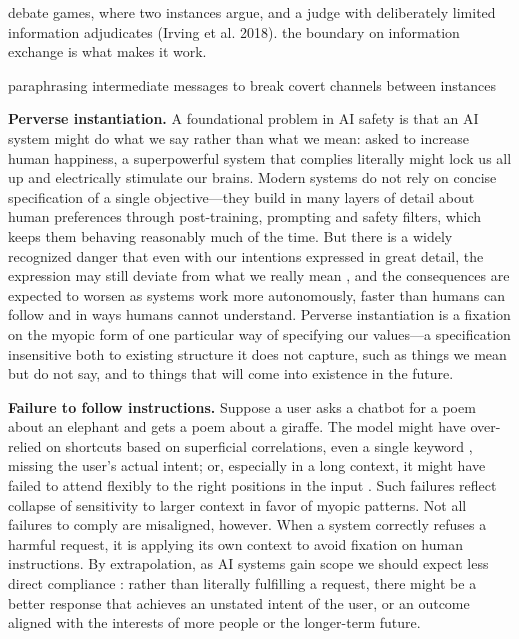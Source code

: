 \documentclass[11pt]{article}
\begin{document}
debate games, where two instances argue, and a judge with deliberately limited information adjudicates (Irving et al. 2018). the boundary on information exchange is what makes it work.

paraphrasing intermediate messages to break covert channels between instances

\textbf{Perverse instantiation.} A foundational problem in AI safety is that an AI system might do what we say rather than what we mean: asked to increase human happiness, a superpowerful system that complies literally might lock us all up and electrically stimulate our brains. Modern systems do not rely on concise specification of a single objective---they build in many layers of detail about human preferences through post-training, prompting and safety filters, which keeps them behaving reasonably much of the time. But there is a widely recognized danger that even with our intentions expressed in great detail, the expression may still deviate from what we really mean \citep{amodei2016concrete, bostrom2014superintelligence, krakovna2020specification}, and the consequences are expected to worsen as systems work more autonomously, faster than humans can follow and in ways humans cannot understand. Perverse instantiation is a fixation on the myopic form of one particular way of specifying our values---a specification insensitive both to existing structure it does not capture, such as things we mean but do not say, and to things that will come into existence in the future.

\textbf{Failure to follow instructions.} Suppose a user asks a chatbot for a poem about an elephant and gets a poem about a giraffe. The model might have over-relied on shortcuts based on superficial correlations, even a single keyword \citep{geirhos2020shortcut}, missing the user's actual intent; or, especially in a long context, it might have failed to attend flexibly to the right positions in the input \citep{liu2024lost}. Such failures reflect collapse of sensitivity to larger context in favor of myopic patterns. Not all failures to comply are misaligned, however. When a system correctly refuses a harmful request, it is applying its own context to avoid fixation on human instructions. By extrapolation, as AI systems gain scope we should expect less direct compliance \citep{hadfieldmenell2016cooperative, russell2019human}: rather than literally fulfilling a request, there might be a better response that achieves an unstated intent of the user, or an outcome aligned with the interests of more people or the longer-term future.
\end{document}
